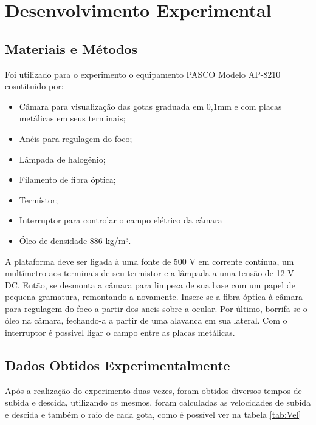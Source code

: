 \section{Desenvolvimento Experimental}
\subsection{Materiais e Métodos}
Foi utilizado para o experimento o equipamento PASCO Modelo AP-8210 cosntituido por: 
\begin{itemize}
	\item Câmara  para visualização das gotas graduada em 0,1mm e com placas metálicas em seus terminais;
	\item Anéis para regulagem do foco;
	\item Lâmpada de halogênio;
	\item Filamento de fibra óptica;
	\item Termístor;
	\item Interruptor para controlar o campo elétrico da câmara
	\item Óleo de densidade 886 kg/m³.
\end{itemize}

A plataforma deve ser ligada à uma fonte de 500 V em corrente contínua, um multímetro aos terminais de seu termistor e a lâmpada a uma tensão de 12 V DC. Então, se desmonta a câmara para limpeza de sua base com um papel de pequena gramatura, remontando-a novamente. Insere-se a fibra óptica à câmara para regulagem do foco a partir dos aneis sobre a ocular. Por último, borrifa-se o óleo na câmara, fechando-a a partir de uma alavanca em sua lateral. Com o interruptor é possivel ligar o campo entre as placas metálicas.      

\subsection{Dados Obtidos Experimentalmente}
Após a realização do experimento duas vezes, foram obtidos diversos tempos de subida e descida, utilizando os mesmos, foram calculadas as velocidades de subida e descida e também o raio de cada gota, como é possível ver na tabela \ref{tab:Vel}

